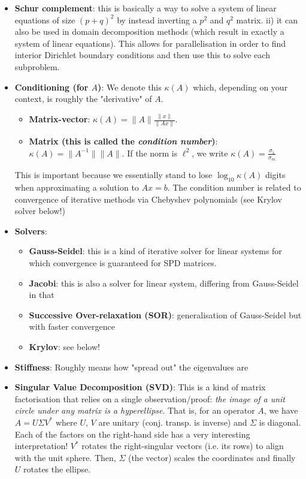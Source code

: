 \begin{itemize}
\item \textbf{Schur complement}: this is basically a way to solve a system of linear equations of size $(p+q)^2$ by instead inverting a $p^2$ and $q^2$ matrix. ii)
it can also be used in domain decomposition methods (which result in exactly a system of linear equations). This allows for parallelisation in order to find
interior Dirichlet boundary conditions and then use this to solve each subproblem.
\item \textbf{Conditioning (for $A$)}: We denote this $\kappa(A)$ which, depending on your context, is roughly the "derivative" of $A$.
\begin{itemize}
\item \textbf{Matrix-vector}: $\kappa(A) = \| A \| \frac{\|x\|}{\| Ax \|}$.
\item \textbf{Matrix (this is called the \emph{condition number})}: $\kappa(A) = \| A^{-1} \| \| A \|$. If the norm is $\ell^2$, we write $\kappa(A) = \frac{\sigma_1}{\sigma_m}$
\end{itemize}
This is important because we essentially stand to lose $\log_{10} \kappa(A)$ digits when approximating a solution to $Ax=b$.
The condition number is related to convergence of iterative methods via Chebyshev polynomials (see Krylov solver below!)
\item \textbf{Solvers}:
\begin{itemize}
\item \textbf{Gauss-Seidel}: this is a kind of iterative solver for linear systems for which convergence is guaranteed for SPD matrices.
\item \textbf{Jacobi}: this is also a solver for linear system, differing from Gauss-Seidel in that 
\item \textbf{Successive Over-relaxation (SOR)}: generalisation of Gauss-Seidel but with faster convergence
\item \textbf{Krylov}: see below!
\end{itemize}
\item \textbf{Stiffness}: Roughly means how "spread out" the eigenvalues are
\item \textbf{Singular Value Decomposition (SVD)}: This is a kind of matrix factorisation that relies on a single observation/proof: \emph{the image of a unit circle under any matrix is a hyperellipse}. That is, for an operator $A$, we have $A = U \Sigma V^*$ where $U$, $V$ are unitary (conj. transp. is inverse) and $\Sigma$ is diagonal.
Each of the factors on the right-hand side has a very interesting interpretation! $V^*$ rotates the right-singular vectors (i.e. its rows) to align with the unit sphere. Then, $\Sigma$ (the vector) scales the coordinates and finally $U$ rotates the ellipse.\\

\end{itemize}
